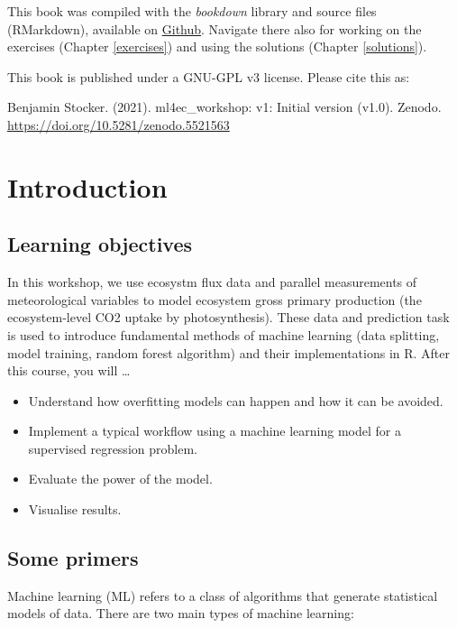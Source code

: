 \documentclass[
]{book}
\providecommand{\tightlist}{%
  \setlength{\itemsep}{0pt}\setlength{\parskip}{0pt}}
\begin{document}
This book was compiled with the \emph{bookdown} library and source files (RMarkdown), available on \href{https://github.com/stineb/ml4ec_workshop}{Github}. Navigate there also for working on the exercises (Chapter \ref{exercises}) and using the solutions (Chapter \ref{solutions}).

This book is published under a GNU-GPL v3 license. Please cite this as:

Benjamin Stocker. (2021). ml4ec\_workshop: v1: Initial version (v1.0). Zenodo. \url{https://doi.org/10.5281/zenodo.5521563}

\hypertarget{introduction}{%
\chapter{Introduction}\label{introduction}}

\hypertarget{learning-objectives}{%
\section{Learning objectives}\label{learning-objectives}}

In this workshop, we use ecosystm flux data and parallel measurements of meteorological variables to model ecosystem gross primary production (the ecosystem-level CO2 uptake by photosynthesis). These data and prediction task is used to introduce fundamental methods of machine learning (data splitting, model training, random forest algorithm) and their implementations in R. After this course, you will \ldots{}

\begin{itemize}
\tightlist
\item
  Understand how overfitting models can happen and how it can be avoided.
\item
  Implement a typical workflow using a machine learning model for a supervised regression problem.
\item
  Evaluate the power of the model.
\item
  Visualise results.
\end{itemize}

\hypertarget{some-primers}{%
\section{Some primers}\label{some-primers}}

Machine learning (ML) refers to a class of algorithms that generate statistical models of data. There are two main types of machine learning:
\end{document}
